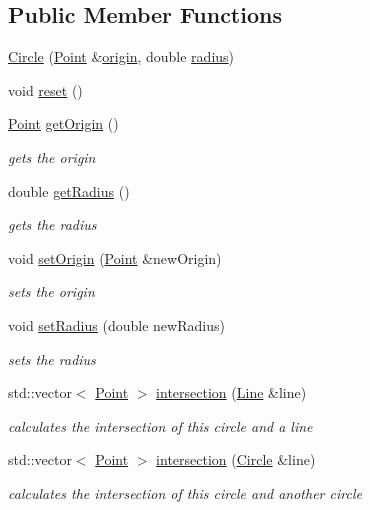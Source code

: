 \subsection*{Public Member Functions}
\begin{DoxyCompactItemize}
\item 
\mbox{\hyperlink{class_jinks_draw_1_1_circle_a716c96c7f03a6ab5865f0da4dc9c4b52}{Circle}} (\mbox{\hyperlink{class_jinks_draw_1_1_point}{Point}} \&\mbox{\hyperlink{class_jinks_draw_1_1_circle_a2214560f54448ce8c0bbb41dc956abe4}{origin}}, double \mbox{\hyperlink{class_jinks_draw_1_1_circle_ad38af0c31ab4aa5d90aaf6cf83a60ab2}{radius}})
\item 
void \mbox{\hyperlink{class_jinks_draw_1_1_circle_aeac44e44f82737c37dfad7f8142e5754}{reset}} ()
\item 
\mbox{\hyperlink{class_jinks_draw_1_1_point}{Point}} \mbox{\hyperlink{class_jinks_draw_1_1_circle_aca5002abc521f58555fa0fa1c55493be}{get\+Origin}} ()
\begin{DoxyCompactList}\small\item\em gets the origin \end{DoxyCompactList}\item 
double \mbox{\hyperlink{class_jinks_draw_1_1_circle_a846165b5fc2a414afbfe04f6d7489fb9}{get\+Radius}} ()
\begin{DoxyCompactList}\small\item\em gets the radius \end{DoxyCompactList}\item 
void \mbox{\hyperlink{class_jinks_draw_1_1_circle_a672cdc8d12a4f9667572bf069ec7988c}{set\+Origin}} (\mbox{\hyperlink{class_jinks_draw_1_1_point}{Point}} \&new\+Origin)
\begin{DoxyCompactList}\small\item\em sets the origin \end{DoxyCompactList}\item 
void \mbox{\hyperlink{class_jinks_draw_1_1_circle_ae22a9e43bd368b4ed2fe4898e2439466}{set\+Radius}} (double new\+Radius)
\begin{DoxyCompactList}\small\item\em sets the radius \end{DoxyCompactList}\item 
std\+::vector$<$ \mbox{\hyperlink{class_jinks_draw_1_1_point}{Point}} $>$ \mbox{\hyperlink{class_jinks_draw_1_1_circle_aaea3c11d7267e06784145ce450be49a8}{intersection}} (\mbox{\hyperlink{class_jinks_draw_1_1_line}{Line}} \&line)
\begin{DoxyCompactList}\small\item\em calculates the intersection of this circle and a line \end{DoxyCompactList}\item 
std\+::vector$<$ \mbox{\hyperlink{class_jinks_draw_1_1_point}{Point}} $>$ \mbox{\hyperlink{class_jinks_draw_1_1_circle_a6b1158a9744529ce7198b66d1bcf8973}{intersection}} (\mbox{\hyperlink{class_jinks_draw_1_1_circle}{Circle}} \&line)
\begin{DoxyCompactList}\small\item\em calculates the intersection of this circle and another circle \end{DoxyCompactList}\end{DoxyCompactItemize}
